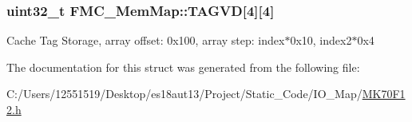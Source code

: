 \subsubsection[{T\+A\+G\+V\+D}]{\setlength{\rightskip}{0pt plus 5cm}uint32\+\_\+t F\+M\+C\+\_\+\+Mem\+Map\+::\+T\+A\+G\+V\+D\mbox{[}4\mbox{]}\mbox{[}4\mbox{]}}\label{struct_f_m_c___mem_map_aceee42cbeff95639e3a10a33f88ecb02}
Cache Tag Storage, array offset\+: 0x100, array step\+: index$\ast$0x10, index2$\ast$0x4 

The documentation for this struct was generated from the following file\+:\begin{DoxyCompactItemize}
\item 
C\+:/\+Users/12551519/\+Desktop/es18aut13/\+Project/\+Static\+\_\+\+Code/\+I\+O\+\_\+\+Map/\hyperlink{_m_k70_f12_8h}{M\+K70\+F12.\+h}\end{DoxyCompactItemize}
